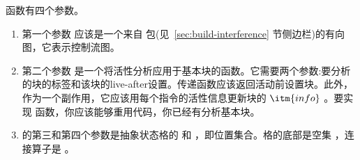 \documentclass[11pt]{book}
\begin{document}
  函数有四个参数。
\begin{enumerate}
\item 第一个参数  应该是一个来自
   包(见~\ref{sec:build-interference} 节侧边栏)的有向图，它表示控制流图。
\item 第二个参数  是一个将活性分析应用于基本块的函数。它需要两个参数:要分析的块的标签和该块的live-after设置。传递函数应该返回活动前设置块。此外，作为一个副作用，它应该用每个指令的活性信息更新块的
  $\itm{info}$ 。要实现  函数，你应该能够重用代码，你已经有分析基本块。
\item  {} 的第三和第四个参数是抽象状态格的
   和  ，即位置集合。格的底部是空集
   ，连接算子是  。
\end{enumerate}
\end{document}
